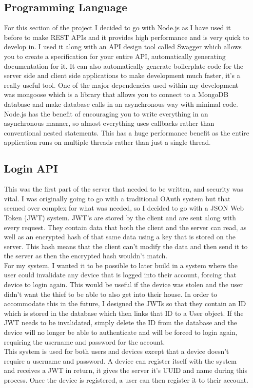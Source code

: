 \subsection{Programming Language}
For this section of the project I decided to go with Node.js as I have used it before to make REST APIs and it provides high performance and is very quick to develop in. I used it along with an API design tool called Swagger which allows you to create a specification for your entire API, automatically generating documentation for it. It can also automatically generate boilerplate code for the server side and client side applications to make development much faster, it's a really useful tool. One of the major dependencies used within my development was mongoose which is a library that allows you to connect to a MongoDB database and make database calls in an asynchronous way with minimal code. Node.js has the benefit of encouraging you to write everything in an asynchronous manner, so almost everything uses callbacks rather than conventional nested statements. This has a huge performance benefit as the entire application runs on multiple threads rather than just a single thread.

\subsection{Login API}
This was the first part of the server that needed to be written, and security was vital. I was originally going to go with a traditional OAuth system but that seemed over complex for what was needed, so I decided to go with a JSON Web Token (JWT) system. JWT's are stored by the client and are sent along with every request. They contain data that both the client and the server can read, as well as an encrypted hash of that same data using a key that is stored on the server. This hash means that the client can't modify the data and then send it to the server as then the encrypted hash wouldn't match. 
\\
\indent For my system, I wanted it to be possible to later build in a system where the user could invalidate any device that is logged into their account, forcing that device to login again. This would be useful if the device was stolen and the user didn't want the thief to be able to also get into their house. In order to accommodate this in the future, I designed the JWTs so that they contain an ID which is stored in the database which then links that ID to a User object. If the JWT needs to be invalidated, simply delete the ID from the database and the device will no longer be able to authenticate and will be forced to login again, requiring the username and password for the account.
\\
\indent This system is used for both users and devices except that a device doesn't require a username and password. A device can register itself with the system and receives a JWT in return, it gives the server it's UUID and name during this process. Once the device is registered, a user can then register it to their account.

